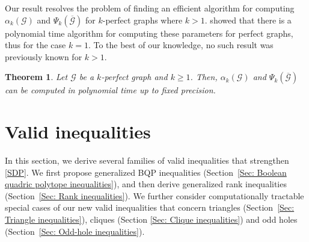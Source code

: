 \documentclass[11pt, a4paper]{article}
\newtheorem{theorem}{Theorem}[section]
\newcommand{\mc}{\mathcal}
\begin{document}
Our result resolves the problem of finding an efficient algorithm for computing $\alpha_k(\mc{G}) $ and $\Psi_k(\overline{\mc{G}})$ for $k$-perfect graphs where $k>1$.
\citet{Grtschel1984PolynomialAF} showed that there is a polynomial time algorithm for computing these parameters for perfect graphs, thus for the case $k=1$.
To the best of our knowledge, no such result was previously known for $k>1$.
\begin{theorem}
    Let $\mc{G}$  be a $k$-perfect graph and $k\geq 1$.  
    Then, $\alpha_k(\mc{G})$ and $\Psi_k(\overline{\mc{G}})$ can be computed in polynomial time up to fixed precision.
\end{theorem} 

\section{Valid inequalities} \label{Sec: Valid inequalities}
In this section, we derive several families of valid inequalities that strengthen \eqref{SDP}.
We first propose generalized BQP inequalities (Section~\ref{Sec: Boolean quadric polytope inequalities}), and then derive generalized rank inequalities (Section~\ref{Sec: Rank inequalities}). 
We further consider computationally tractable special cases of our new valid inequalities that concern triangles (Section~\ref{Sec: Triangle inequalities}), cliques (Section \ref{Sec: Clique inequalities}) and odd holes (Section~\ref{Sec: Odd-hole inequalities}).
\end{document}
